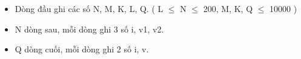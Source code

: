 \begin{itemize}
	\item        Dòng đầu ghi    các số N, M, K, L, Q. ( L  $\le$  N  $\le$  200, M, K, Q  $\le$  10000    )      
	\item        N dòng sau, mỗi    dòng ghi 3 số i, v1, v2.      
	\item        Q dòng cuối,    mỗi dòng ghi 2 số i, v.      
\end{itemize}